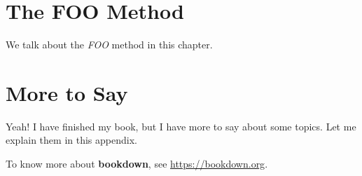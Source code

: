 \documentclass[]{krantz}
\theoremstyle{definition}
\theoremstyle{definition}
\theoremstyle{definition}
\theoremstyle{remark}
\begin{document}
\hypertarget{the-foo-method}{%
\chapter{The FOO Method}\label{the-foo-method}}

We talk about the \emph{FOO} method in this chapter.

\cleardoublepage

\hypertarget{appendix-appendix}{%
\appendix {}}


\hypertarget{more-to-say}{%
\chapter{More to Say}\label{more-to-say}}

Yeah! I have finished my book, but I have more to say about some topics.
Let me explain them in this appendix.

To know more about \textbf{bookdown}, see \url{https://bookdown.org}.



\backmatter
\printindex
\end{document}

